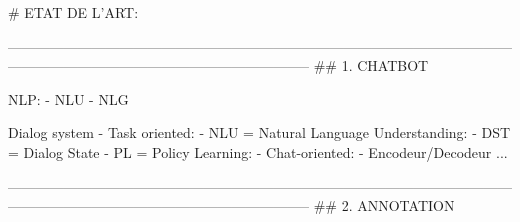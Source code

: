# ETAT DE L'ART:

-----------------------------------------------------------------------------------------------------------------------------------------------------------------------------
## 1. CHATBOT

NLP:
- NLU
- NLG

Dialog system
- Task oriented:
	- NLU = Natural Language Understanding:
	- DST = Dialog State
	- PL = Policy Learning:
- Chat-oriented:
	- Encodeur/Decodeur
	...


-----------------------------------------------------------------------------------------------------------------------------------------------------------------------------
## 2. ANNOTATION